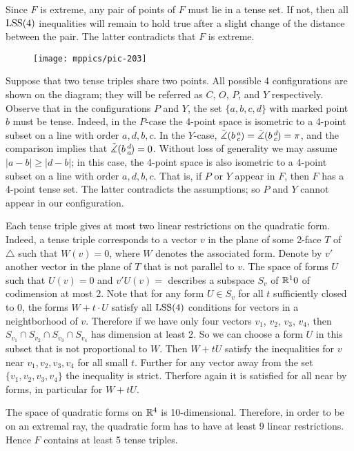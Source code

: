 \documentclass{article}
\begin{document}
Since $F$ is extreme, any pair of points of $F$ must lie in a tense set.
If not, then all $\mathrm{LSS}(4)$ inequalities will remain to hold true after a slight change of the distance between the pair.
The latter contradicts that $F$ is extreme.

\begin{wrapfigure}[5]{l}{60mm}
\vskip-2mm
\centering
\texttt{[image: mppics/pic-203]}
\label{page:COPY}
\end{wrapfigure}

Suppose that two tense triples share two points.
All possible 4 configurations are shown on the diagram; they will be referred as $C$, $O$, $P$, and $Y$ respectively.
Observe that in the configurations $P$ and $Y$, the set $\{a,b,c,d\}$ with marked point $b$ must be tense.
Indeed, in the $P$-case the 4-point space is isometric to a 4-point subset on a line with order $a,d,b,c$.
In the $Y$-case, $\tilde\measuredangle(b\,{}^{a}_{c}\hspace{-0.2ex})=\tilde\measuredangle(b\,{}^{d}_{c}\hspace{-0.2ex})=\pi$, and the comparison implies that $\tilde\measuredangle(b\,{}^{d}_{a}\hspace{-0.2ex})=0$.
Without loss of generality we may assume $|a-b|\ge |d-b|$;
in this case, the 4-point space is also isometric to a 4-point subset on a line with order $a,d,b,c$.
That is, if $P$ or $Y$ appear in $F$, then $F$ has a 4-point tense set.
The latter contradicts the assumptions; so $P$ and $Y$ cannot appear in our configuration.

Each tense triple gives at most two linear restrictions on the quadratic form.
Indeed, a tense triple corresponds to a vector $v$ in the plane of some 2-face $T$ of $\triangle$ such that 
$W(v)=0$, where $W$ denotes the associated form.
Denote by $v'$ another vector in the plane of $T$ that is not parallel to $v$.
The space of forms $U$ such that $U(v)=0$ and $v'U(v)=$ describes a subspace $S_v$ of $\mathbb{R}^10$ of codimension at most 2.
Note that for any form $U\in S_v$ for all $t$ sufficiently closed to 0, the forms $W+t\cdot U$ satisfy all $\mathrm{LSS}(4)$ conditions for vectors in a neightborhood of $v$.
Therefore if we have only four vectors $v_1$, $v_2$, $v_3$, $v_4$, then $S_{v_1}\cap S_{v_2}\cap S_{v_3}\cap S_{v_4}$ has dimension at least 2.
So we can choose a form $U$ in this subset that is not proportional to $W$.
Then $W+tU$ satisfy the inequalities for $v$ near $v_1,v_2,v_3,v_4$ for all small $t$.
Further for any vector away from the set $\{v_1,v_2,v_3,v_4\}$ the inequality is strict.
Therfore again it is satisfied for all near by forms, in particular for $W+tU$.

The space of quadratic forms on $\mathbb{R}^4$ is 10-dimensional.
Therefore, in order to be on an extremal ray, the quadratic form has to have at least 9 linear restrictions.
Hence $F$ contains at least 5 tense triples.
\end{document}
